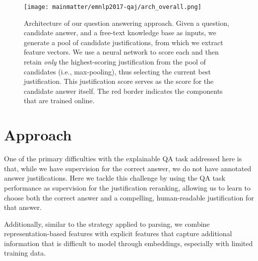 \begin{figure}[t]
\begin{center}
\texttt{[image: mainmatter/emnlp2017-qaj/arch\_overall.png]}
\caption{ Architecture of our question answering approach.  
Given a question, candidate answer, and a free-text knowledge base as inputs, we generate a pool of candidate justifications, from which we extract feature vectors.  We use a neural network to score each and then retain \textit{only} the highest-scoring justification from the pool of candidates (i.e., max-pooling), thus selecting the current best justification. This justification score serves as the score for the candidate answer itself.  The red border indicates the components that are trained online. }
\label{fig:arch_overall}
\end{center}
\end{figure}

\section{Approach}
\label{sec-emnlp2017:approach}
One of the primary difficulties with the explainable QA task addressed here is that, while we have supervision for the correct answer, we do not have annotated answer justifications.  
Here we tackle this challenge by using the QA task performance as supervision for the justification reranking, allowing us to 
learn to choose both the correct answer and a compelling, human-readable justification for that answer.

Additionally, similar to the strategy \citet{chen2014fast} applied to parsing, we combine representation-based features with explicit features that capture additional information that is difficult to model through embeddings, especially with limited training data.


